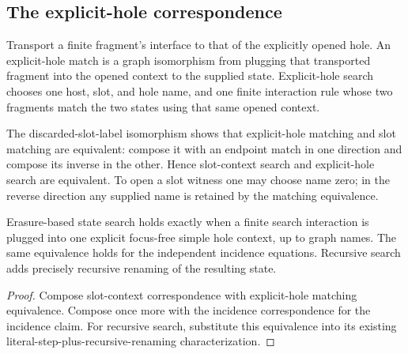 \subsection{The explicit-hole correspondence}
\begin{definition}\label{term:hole-context-search}
Transport a finite fragment's interface to that of the explicitly opened hole.
An explicit-hole match is a graph isomorphism from plugging that transported
fragment into the opened context to the supplied state. Explicit-hole search
chooses one host, slot, and hole name, and one finite interaction rule whose
two fragments match the two states using that same opened context.
\end{definition}
The discarded-slot-label isomorphism shows that explicit-hole matching and
slot matching are equivalent: compose it with an endpoint match in one
direction and compose its inverse in the other. Hence slot-context search
and explicit-hole search are equivalent. To open a slot witness one may choose
name zero; in the reverse direction any supplied name is retained by the
matching equivalence.
\begin{theorem}
Erasure-based state search holds exactly when a finite search interaction is
plugged into one explicit focus-free simple hole context, up to graph names.
The same equivalence holds for the independent incidence equations. Recursive
search adds precisely recursive renaming of the resulting state.
\end{theorem}
\begin{proof}
Compose slot-context correspondence with explicit-hole matching equivalence.
Compose once more with the incidence correspondence for the incidence claim.
For recursive search, substitute this equivalence into its existing
literal-step-plus-recursive-renaming characterization.
\end{proof}

